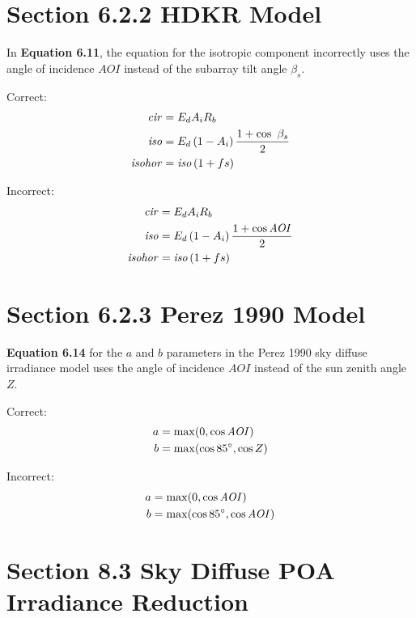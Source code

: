 \documentclass[report]{nrel}
\begin{document}
\section*{Section 6.2.2 HDKR Model}

In \textbf{Equation 6.11}, the equation for the isotropic component incorrectly uses the angle of incidence $\mathit{AOI}$ instead of the subarray tilt angle $\beta_s$.

Correct:
\begin{align*}
\mathit{cir} &= E_d A_i R_b \notag\\
\mathit{iso} &= E_d \left( 1 - A_i \right) \frac{1 + \cos\ \beta_s}{2} \notag\\
\mathit{isohor} &= \mathit{iso} \left( 1 + f s \right)
\end{align*}

Incorrect:
\begin{align*}
\mathit{cir} &= E_d A_i R_b \notag\\
\mathit{iso} &= E_d \left( 1 - A_i \right) \frac{1 + \cos\mathit{AOI}}{2} \notag\\
\mathit{isohor} &= \mathit{iso} \left( 1 + f s \right)
\end{align*}

\section*{Section 6.2.3 Perez 1990 Model}

\textbf{Equation 6.14} for the $a$ and $b$ parameters in the Perez 1990 sky diffuse irradiance model uses the angle of incidence $AOI$ instead of the sun zenith angle $Z$.

Correct:
\begin{align*}
a &= \max( 0, \cos \mathit{AOI} ) \notag\\
b & =\max( \cos85\degree, \cos Z) 
\end{align*}

Incorrect:
\begin{align*}
a &= \max( 0, \cos \mathit{AOI} ) \notag\\
b & =\max( \cos85\degree, \cos \mathit{AOI}) 
\end{align*}

\section*{Section 8.3 Sky Diffuse POA Irradiance Reduction}
\end{document}
